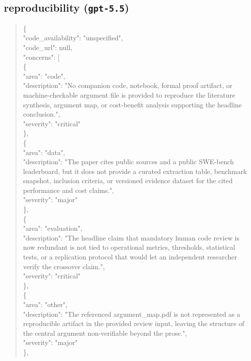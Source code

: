 \documentclass[11pt]{article}
\begin{document}
\subsection*{reproducibility (\texttt{gpt-5.5})}
\begin{quote}\small\ttfamily\raggedright
\{\\
  "code\_availability": "unspecified",\\
  "code\_url": null,\\
  "concerns": [\\
    \{\\
      "area": "code",\\
      "description": "No companion code, notebook, formal proof artifact, or machine-checkable argument file is provided to reproduce the literature synthesis, argument map, or cost-benefit analysis supporting the headline conclusion.",\\
      "severity": "critical"\\
    \},\\
    \{\\
      "area": "data",\\
      "description": "The paper cites public sources and a public SWE-bench leaderboard, but it does not provide a curated extraction table, benchmark snapshot, inclusion criteria, or versioned evidence dataset for the cited performance and cost claims.",\\
      "severity": "major"\\
    \},\\
    \{\\
      "area": "evaluation",\\
      "description": "The headline claim that mandatory human code review is now redundant is not tied to operational metrics, thresholds, statistical tests, or a replication protocol that would let an independent researcher verify the crossover claim.",\\
      "severity": "critical"\\
    \},\\
    \{\\
      "area": "other",\\
      "description": "The referenced argument\_map.pdf is not represented as a reproducible artifact in the provided review input, leaving the structure of the central argument non-verifiable beyond the prose.",\\
      "severity": "major"\\
    \},\\

\end{quote}
\end{document}
